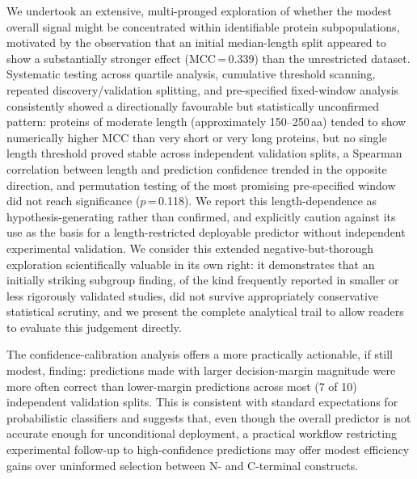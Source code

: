 \documentclass[unnumsec,webpdf,contemporary,large]{oup-authoring-template}
\begin{document}
We undertook an extensive, multi-pronged exploration of whether the modest overall signal might be concentrated within identifiable protein subpopulations, motivated by the observation that an initial median-length split appeared to show a substantially stronger effect (MCC\,=\,0.339) than the unrestricted dataset. Systematic testing across quartile analysis, cumulative threshold scanning, repeated discovery/validation splitting, and pre-specified fixed-window analysis consistently showed a directionally favourable but statistically unconfirmed pattern: proteins of moderate length (approximately 150--250\,aa) tended to show numerically higher MCC than very short or very long proteins, but no single length threshold proved stable across independent validation splits, a Spearman correlation between length and prediction confidence trended in the opposite direction, and permutation testing of the most promising pre-specified window did not reach significance ($p$\,=\,0.118). We report this length-dependence as hypothesis-generating rather than confirmed, and explicitly caution against its use as the basis for a length-restricted deployable predictor without independent experimental validation. We consider this extended negative-but-thorough exploration scientifically valuable in its own right: it demonstrates that an initially striking subgroup finding, of the kind frequently reported in smaller or less rigorously validated studies, did not survive appropriately conservative statistical scrutiny, and we present the complete analytical trail to allow readers to evaluate this judgement directly.

The confidence-calibration analysis offers a more practically actionable, if still modest, finding: predictions made with larger decision-margin magnitude were more often correct than lower-margin predictions across most (7 of 10) independent validation splits. This is consistent with standard expectations for probabilistic classifiers and suggests that, even though the overall predictor is not accurate enough for unconditional deployment, a practical workflow restricting experimental follow-up to high-confidence predictions may offer modest efficiency gains over uninformed selection between N- and C-terminal constructs.
\end{document}
